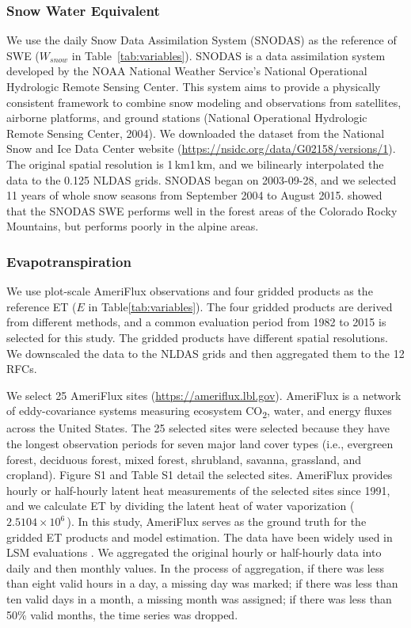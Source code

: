\documentclass[essd, manuscript]{copernicus}
\let\unit\undefined
\begin{document}
\subsubsection{Snow Water Equivalent}

We use the daily Snow Data Assimilation System (SNODAS) as the reference of SWE (\(W_{snow}\) in Table~\ref{tab:variables}). SNODAS is a data assimilation system developed by the NOAA National Weather Service's National Operational Hydrologic Remote Sensing Center. This system aims to provide a physically consistent framework to combine snow modeling and observations from satellites, airborne platforms, and ground stations (National Operational Hydrologic Remote Sensing Center, 2004). We downloaded the dataset from the National Snow and Ice Data Center website (\url{https://nsidc.org/data/G02158/versions/1}). The original spatial resolution is 1\,km\times{}1\,km, and we bilinearly interpolated the data to the 0.125\degree{} NLDAS grids. SNODAS began on 2003-09-28, and we selected 11 years of whole snow seasons from September 2004 to August 2015. \citet{clow2012HP} showed that the SNODAS SWE performs well in the forest areas of the Colorado Rocky Mountains, but performs poorly in the alpine areas.

\subsubsection{Evapotranspiration}\label{sec:methods:ref:et}

We use plot-scale AmeriFlux observations and four gridded products as the reference ET (\(E\) in Table\ref{tab:variables}). The four gridded products are derived from different methods, and a common evaluation period from 1982 to 2015 is selected for this study. The gridded products have different spatial resolutions. We downscaled the data to the NLDAS grids and then aggregated them to the 12 RFCs.

We select 25 AmeriFlux sites (\url{https://ameriflux.lbl.gov}). AmeriFlux is a network of eddy-covariance systems measuring ecosystem CO\textsubscript{2}, water, and energy fluxes across the United States. The 25 selected sites were selected because they have the longest observation periods for seven major land cover types (i.e., evergreen forest, deciduous forest, mixed forest, shrubland, savanna, grassland, and cropland). Figure S1 and Table S1 detail the selected sites. AmeriFlux provides hourly or half-hourly latent heat measurements of the selected sites since 1991, and we calculate ET by dividing the latent heat of water vaporization (\(2.5104\times{}10^6\)\,\unit{J~kg^{-1}}). In this study, AmeriFlux serves as the ground truth for the gridded ET products and model estimation. The data have been widely used in LSM evaluations \citep{cai2014JGRA, zhang2020AFM}. We aggregated the original hourly or half-hourly data into daily and then monthly values. In the process of aggregation, if there was less than eight valid hours in a day, a missing day was marked; if there was less than ten valid days in a month, a missing month was assigned; if there was less than 50\% valid months, the time series was dropped.
\end{document}

